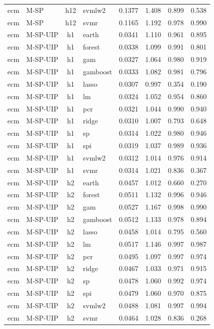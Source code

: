 \begin{ThreePartTable}
\begin{longtable}[t]{llclcccc}
ecm & M-SP & h12 & svmlw2 & 0.1377 & 1.408 & 0.899 & 0.538\\
ecm & M-SP & h12 & svmr & 0.1165 & 1.192 & 0.978 & 0.990\\
\addlinespace
ecm & M-SP-UIP & h1 & earth & 0.0341 & 1.110 & 0.961 & 0.895\\
ecm & M-SP-UIP & h1 & forest & 0.0338 & 1.099 & 0.991 & 0.801\\
ecm & M-SP-UIP & h1 & gam & 0.0327 & 1.064 & 0.980 & 0.919\\
ecm & M-SP-UIP & h1 & gamboost & 0.0333 & 1.082 & 0.981 & 0.796\\
ecm & M-SP-UIP & h1 & lasso & 0.0307 & 0.997 & 0.354 & 0.190\\
ecm & M-SP-UIP & h1 & lm & 0.0324 & 1.052 & 0.954 & 0.860\\
ecm & M-SP-UIP & h1 & pcr & 0.0321 & 1.044 & 0.990 & 0.940\\
ecm & M-SP-UIP & h1 & ridge & 0.0310 & 1.007 & 0.793 & 0.648\\
ecm & M-SP-UIP & h1 & sp & 0.0314 & 1.022 & 0.980 & 0.946\\
ecm & M-SP-UIP & h1 & spi & 0.0319 & 1.037 & 0.989 & 0.936\\
ecm & M-SP-UIP & h1 & svmlw2 & 0.0312 & 1.014 & 0.976 & 0.914\\
ecm & M-SP-UIP & h1 & svmr & 0.0314 & 1.021 & 0.836 & 0.367\\
\addlinespace
ecm & M-SP-UIP & h2 & earth & 0.0457 & 1.012 & 0.660 & 0.270\\
ecm & M-SP-UIP & h2 & forest & 0.0511 & 1.132 & 0.996 & 0.946\\
ecm & M-SP-UIP & h2 & gam & 0.0527 & 1.167 & 0.998 & 0.990\\
ecm & M-SP-UIP & h2 & gamboost & 0.0512 & 1.133 & 0.978 & 0.894\\
ecm & M-SP-UIP & h2 & lasso & 0.0458 & 1.014 & 0.795 & 0.560\\
ecm & M-SP-UIP & h2 & lm & 0.0517 & 1.146 & 0.997 & 0.987\\
ecm & M-SP-UIP & h2 & pcr & 0.0495 & 1.097 & 0.997 & 0.974\\
ecm & M-SP-UIP & h2 & ridge & 0.0467 & 1.033 & 0.971 & 0.915\\
ecm & M-SP-UIP & h2 & sp & 0.0478 & 1.060 & 0.992 & 0.974\\
ecm & M-SP-UIP & h2 & spi & 0.0479 & 1.060 & 0.970 & 0.875\\
ecm & M-SP-UIP & h2 & svmlw2 & 0.0488 & 1.081 & 0.997 & 0.994\\
ecm & M-SP-UIP & h2 & svmr & 0.0464 & 1.028 & 0.836 & 0.268\\

\end{longtable}
\end{ThreePartTable}
